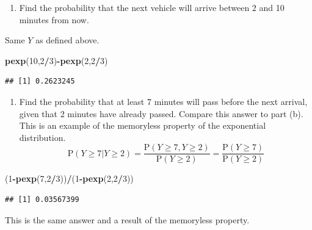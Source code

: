 \documentclass[
]{book}
\newenvironment{Shaded}{\begin{snugshade}}{\end{snugshade}}
\newcommand{\DecValTok}[1]{\textcolor[rgb]{0.00,0.00,0.81}{#1}}
\newcommand{\KeywordTok}[1]{\textcolor[rgb]{0.13,0.29,0.53}{\textbf{#1}}}
\newcommand{\NormalTok}[1]{#1}
\newcommand{\OperatorTok}[1]{\textcolor[rgb]{0.81,0.36,0.00}{\textbf{#1}}}
\providecommand{\tightlist}{%
  \setlength{\itemsep}{0pt}\setlength{\parskip}{0pt}}
\begin{document}
\begin{enumerate}
\def\labelenumi{\alph{enumi}.}
\setcounter{enumi}{2}
\tightlist
\item
  Find the probability that the next vehicle will arrive between 2 and 10 minutes from now.
\end{enumerate}

Same \(Y\) as defined above.

\begin{Shaded}
\begin{Highlighting}[]
\KeywordTok{pexp}\NormalTok{(}\DecValTok{10}\NormalTok{,}\DecValTok{2}\OperatorTok{/}\DecValTok{3}\NormalTok{)}\OperatorTok{-}\KeywordTok{pexp}\NormalTok{(}\DecValTok{2}\NormalTok{,}\DecValTok{2}\OperatorTok{/}\DecValTok{3}\NormalTok{)}
\end{Highlighting}
\end{Shaded}

\begin{verbatim}
## [1] 0.2623245
\end{verbatim}

\begin{enumerate}
\def\labelenumi{\alph{enumi}.}
\setcounter{enumi}{3}
\tightlist
\item
  Find the probability that at least 7 minutes will pass before the next arrival, given that 2 minutes have already passed. Compare this answer to part (b). This is an example of the memoryless property of the exponential distribution.
  \[
  \mbox{P}(Y\geq 7|Y\geq 2) = \frac{\mbox{P}(Y\geq 7, Y\geq 2)}{\mbox{P}(Y\geq 2)} = \frac{\mbox{P}(Y\geq 7)}{\mbox{P}(Y\geq 2)}
  \]
\end{enumerate}

\begin{Shaded}
\begin{Highlighting}[]
\NormalTok{(}\DecValTok{1}\OperatorTok{-}\KeywordTok{pexp}\NormalTok{(}\DecValTok{7}\NormalTok{,}\DecValTok{2}\OperatorTok{/}\DecValTok{3}\NormalTok{))}\OperatorTok{/}\NormalTok{(}\DecValTok{1}\OperatorTok{-}\KeywordTok{pexp}\NormalTok{(}\DecValTok{2}\NormalTok{,}\DecValTok{2}\OperatorTok{/}\DecValTok{3}\NormalTok{))}
\end{Highlighting}
\end{Shaded}

\begin{verbatim}
## [1] 0.03567399
\end{verbatim}

This is the same answer and a result of the memoryless property.
\end{document}
